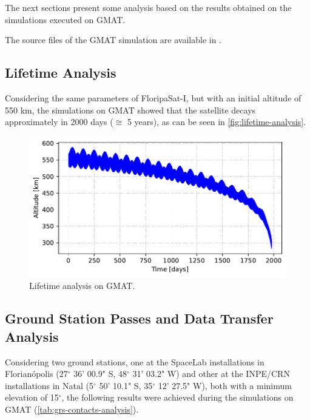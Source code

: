 The next sections present some analysis based on the results obtained on the simulations executed on GMAT.

The source files of the GMAT simulation are available in \cite{fsat2-mechanical}.

\subsection{Lifetime Analysis}

Considering the same parameters of FloripaSat-I, but with an initial altitude of 550 km, the simulations on GMAT showed that the satellite decays approximately in 2000 days ($\cong$ 5 years), as can be seen in \autoref{fig:lifetime-analysis}.

\begin{figure}[!ht]
    \begin{center}
        \includegraphics[width=\textwidth]{curves/lifetime.pdf}
        \caption{Lifetime analysis on GMAT.}
        \label{fig:lifetime-analysis}
    \end{center}
\end{figure}

\subsection{Ground Station Passes and Data Transfer Analysis}

Considering two ground stations, one at the SpaceLab installations in Florianópolis (27$^{\circ}$ 36' 00.9" S, 48$^{\circ}$ 31' 03.2" W) and other at the INPE/CRN installations in Natal (5$^{\circ}$ 50' 10.1" S, 35$^{\circ}$ 12' 27.5" W), both with a minimum elevation of 15$^{\circ}$, the following results were achieved during the simulations on GMAT (\autoref{tab:grs-contacts-analysis}).

